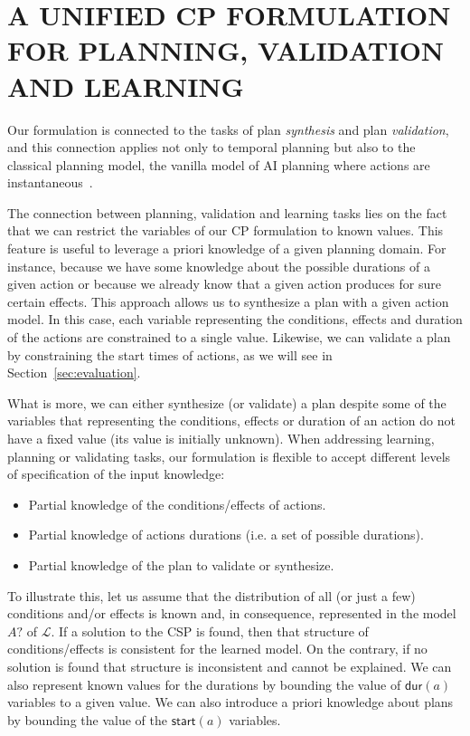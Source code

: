\documentclass{ecai}
\newcommand{\dur}{\mathsf{dur}}    %
\newcommand{\start}{\mathsf{start}}%
\begin{document}
\section{A UNIFIED CP FORMULATION FOR PLANNING, VALIDATION AND LEARNING}
\label{sec:usingCPValidation}


Our formulation is connected to the tasks of plan {\em synthesis} and plan {\em validation}, and this connection applies not only to temporal planning but also to the classical planning model, the vanilla model of AI planning where actions are instantaneous~\cite{geffner2013concise}. 

The connection between planning, validation and learning tasks lies on the fact that we can restrict the variables of our CP formulation to known values. This feature is useful to leverage a priori knowledge of a given planning domain. For instance, because we have some knowledge about the possible durations of a given action or because we already know that a given action produces for sure certain effects. This approach allows us to synthesize a plan with a given action model. In this case, each variable representing the conditions, effects and duration of the actions are constrained to a single value. Likewise, we can validate a plan by constraining the start times of actions, as we will see in Section~\ref{sec:evaluation}.

What is more, we can either synthesize (or validate) a plan despite some of the variables that representing the conditions, effects or duration of an action do not have a fixed value (its value is initially unknown). When addressing learning, planning or validating tasks, our formulation is flexible to accept different levels of specification of the input knowledge:

\begin{itemize}
\item Partial knowledge of the conditions/effects of actions.
\item Partial knowledge of actions durations (i.e. a set of possible durations).
\item Partial knowledge of the plan to validate or synthesize.
\end{itemize}

To illustrate this, let us assume that the distribution of all (or just a few) conditions and/or effects is known and, in consequence, represented in the model $A?$ of $\mathcal{L}$. If a solution to the CSP is found, then that structure of conditions/effects is consistent for the learned model. On the contrary, if no solution is found that structure is inconsistent and cannot be explained. We can also represent known values for the durations by bounding the value of $\dur(a)$ variables to a given value. We can also introduce a priori knowledge about plans by bounding the value of the $\start(a)$ variables.
\end{document}
